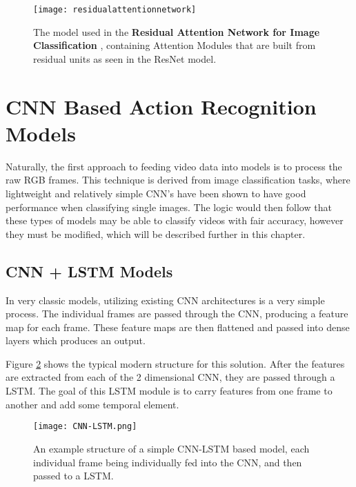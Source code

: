 \begin{figure}[ht]
	\texttt{[image: residualattentionnetwork]}
	\centering
	\caption{The model used in the \textbf{Residual Attention Network for Image Classification} \cite{residualattentionnetwork}, containing Attention Modules that are built from residual units as seen in the ResNet \cite{resnet} model.}
	\label{fig:residualattentionnetwork}
\end{figure}

\section{CNN Based Action Recognition Models}

Naturally, the first approach to feeding video data into models is to process the raw RGB frames. This technique is derived from image classification tasks, where lightweight and relatively simple CNN's have been shown to have good performance when classifying single images. The logic would then follow that these types of models may be able to classify videos with fair accuracy, however they must be modified, which will be described further in this chapter.

\subsection{CNN + LSTM Models}

In very classic models, utilizing existing CNN architectures is a very simple process. The individual frames are passed through the CNN, producing a feature map for each frame. These feature maps are then flattened and passed into dense layers which produces an output.

Figure \ref{fig:cnn-lstm} shows the typical modern structure for this solution. After the features are extracted from each of the 2 dimensional CNN, they are passed through a LSTM. The goal of this LSTM module is to carry features from one frame to another and add some temporal element.

\begin{figure}[ht]
	\texttt{[image: CNN-LSTM.png]}
	\centering
	\caption{An example structure of a simple CNN-LSTM based model, each individual frame being individually fed into the CNN, and then passed to a LSTM.}
	\label{fig:cnn-lstm}
\end{figure}

